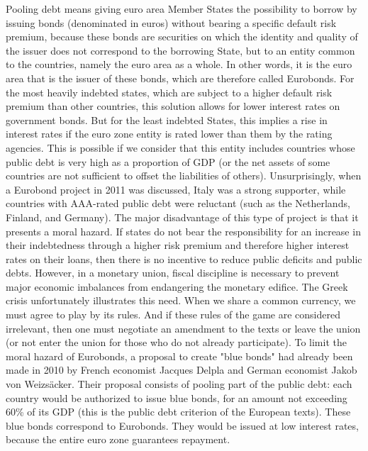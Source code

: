 \documentclass[12pt]{article}
\begin{document}
Pooling debt means giving euro area Member States the possibility to borrow by issuing bonds (denominated in euros) without bearing a specific default risk premium, because these bonds are securities on which the identity and quality of the issuer does not correspond to the borrowing State, but to an entity common to the countries, namely the euro area as a whole. In other words, it is the euro area that is the issuer of these bonds, which are therefore called Eurobonds. For the most heavily indebted states, which are subject to a higher default risk premium than other countries, this solution allows for lower interest rates on government bonds. But for the least indebted States, this implies a rise in interest rates if the euro zone entity is rated lower than them by the rating agencies. This is possible if we consider that this entity includes countries whose public debt is very high as a proportion of GDP (or the net assets of some countries are not sufficient to offset the liabilities of others). Unsurprisingly, when a Eurobond project in 2011 was discussed, Italy was a strong supporter, while countries with AAA-rated public debt were reluctant (such as the Netherlands, Finland, and Germany). The major disadvantage of this type of project is that it presents a moral hazard. If states do not bear the responsibility for an increase in their indebtedness through a higher risk premium and therefore higher interest rates on their loans, then there is no incentive to reduce public deficits and public debts. However, in a monetary union, fiscal discipline is necessary to prevent major economic imbalances from endangering the monetary edifice. The Greek crisis unfortunately illustrates this need. When we share a common currency, we must agree to play by its rules. And if these rules of the game are considered irrelevant, then one must negotiate an amendment to the texts or leave the union (or not enter the union for those who do not already participate). To limit the moral hazard of Eurobonds, a proposal to create "blue bonds" had already been made in 2010 by French economist Jacques Delpla and German economist Jakob von Weizsäcker. Their proposal consists of pooling part of the public debt: each country would be authorized to issue blue bonds, for an amount not exceeding 60\% of its GDP (this is the public debt criterion of the European texts). These blue bonds correspond to Eurobonds. They would be issued at low interest rates, because the entire euro zone guarantees repayment.
\end{document}
